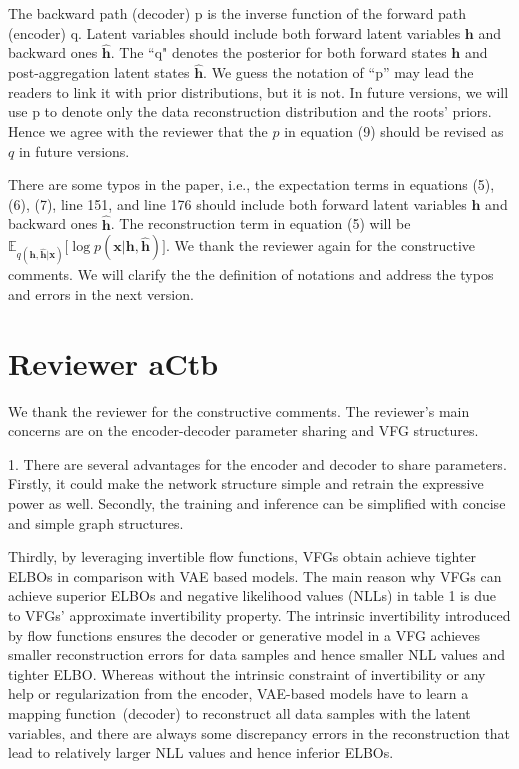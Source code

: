 \documentclass{article}
\begin{document}
The backward path (decoder) p is the inverse function of the forward path (encoder) q.  Latent variables should include both forward latent variables $\mathbf{h}$ and backward ones $\widehat{\mathbf{h}}$. The ``q"  denotes the posterior for both forward states $\mathbf{h}$ and post-aggregation latent states $\widehat{\mathbf{h}}$.  We guess the notation of ``p” may lead the readers to link it with prior distributions, but it is not.  In future versions, we will use p to denote only the data reconstruction distribution and the roots' priors. Hence we agree with the reviewer that the $p$ in equation (9) should be revised as $q$ in future versions. 

There are some typos in the paper, i.e., the expectation terms in equations (5), (6), (7), line 151, and line 176 should include both forward latent variables $\mathbf{h}$ and backward ones $\widehat{\mathbf{h}}$. The reconstruction term in equation (5) will be 
$\mathbb{E}_{q(\mathbf{h}, \widehat{\mathbf{h}}|\mathbf{x})}\big[ \log p(\mathbf{x}|\mathbf{h}, \widehat{\mathbf{h}})  \big]$. We thank the reviewer again for the constructive comments. We will clarify the the definition of notations and address the typos and errors in the next version. 





\section{Reviewer aCtb}
We thank the reviewer for the constructive comments. The reviewer's main concerns are on the encoder-decoder parameter sharing and VFG structures. 

1.
There are several advantages for the encoder and decoder to share parameters. Firstly, it could make the network structure simple and retrain the expressive power as well. Secondly, the training and inference can be simplified with concise and simple graph structures. 

Thirdly, by leveraging invertible flow functions, VFGs obtain achieve tighter ELBOs in comparison with VAE based models. The main reason why VFGs can achieve superior ELBOs and negative likelihood values (NLLs) in table 1 is due to VFGs' approximate invertibility property. The intrinsic invertibility introduced by flow functions ensures the decoder or generative model in a VFG  achieves smaller reconstruction errors for data samples and hence smaller NLL values and tighter ELBO. Whereas without the intrinsic constraint of invertibility or any help or regularization from the encoder, VAE-based models have to learn a  mapping function~(decoder) to reconstruct all data samples with the latent variables, and there are always some discrepancy errors in the reconstruction that lead to relatively larger NLL values and hence inferior ELBOs.
\end{document}
